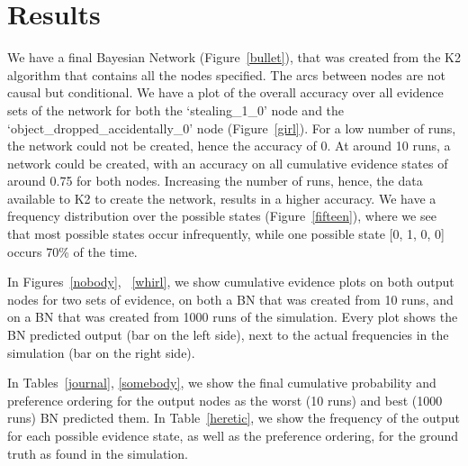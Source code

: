 \documentclass[11pt]{article}
\begin{document}
\section{Results}



We have a final Bayesian Network (Figure~\ref{bullet}), that was created from the K2 algorithm that contains all the nodes specified. The arcs between nodes are not causal but conditional. We have a plot of the overall accuracy over all evidence sets of the network for both the `stealing\_1\_0' node and the `object\_dropped\_accidentally\_0' node (Figure~\ref{girl}). For a low number of runs, the network could not be created, hence the accuracy of 0. At around 10 runs, a network could be created, with an accuracy on all cumulative evidence states of around 0.75 for both nodes. Increasing the number of runs, hence, the data available to K2 to create the network, results in a higher accuracy. We have a frequency distribution over the possible states (Figure~\ref{fifteen}), where we see that most possible states occur infrequently, while one possible state [0, 1, 0, 0] occurs 70\% of the time. 

In Figures~\ref{nobody}, ~\ref{whirl}, we show cumulative evidence plots on both output nodes for two sets of evidence, on both a BN that was created from 10 runs, and on a BN that was created from 1000 runs of the simulation. Every plot shows the BN predicted output (bar on the left side), next to the actual frequencies in the simulation (bar on the right side).

In Tables~\ref{journal}, \ref{somebody}, we show the final cumulative probability and preference ordering for the output nodes as the worst (10 runs) and best (1000 runs) BN predicted them. In Table~\ref{heretic}, we show the frequency of the output for each possible evidence state, as well as the preference ordering, for the ground truth as found in the simulation.
\end{document}

